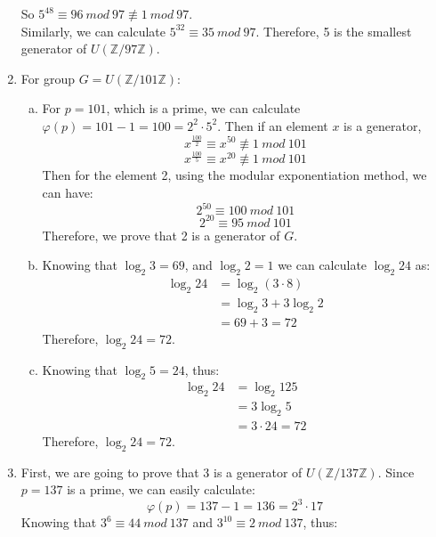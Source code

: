 \documentclass[12pt, a4paper]{article}
\begin{document}
\begin{enumerate}
          So $5^{48} \equiv 96\ mod\ 97 \not\equiv 1\ mod\ 97$.\\
          Similarly, we can calculate $5^{32} \equiv 35\ mod\ 97$. Therefore, 
          5 is the smallest generator of $U(\mathbb{Z}/97\mathbb{Z})$.
    \item For group $G = U(\mathbb{Z}/101\mathbb{Z})$:
          \begin{enumerate}[(a)]
              \item For $p = 101$, which is a prime, we can calculate 
                    $\varphi(p) = 101 - 1 = 100 = 2^2 \cdot 5^2$. 
                    Then if an element $x$ is a generator, 
                    $$x^{\frac{100}{2}} \equiv x^{50} \not\equiv 1\ mod\ 101$$
                    $$x^{\frac{100}{5}} \equiv x^{20} \not\equiv 1\ mod\ 101$$
                    Then for the element 2, using the modular exponentiation method, we can have:
                    $$2^{50} \equiv 100\ mod\ 101$$
                    $$2^{20} \equiv 95\ mod\ 101$$
                    Therefore, we prove that 2 is a generator of $G$.
              \item Knowing that $\log_2 3 = 69$, and $\log_2 2 = 1$
                    we can calculate $\log_2 24$ as:
                    \begin{align*}
                        \log_2 24 &= \log_2 (3\cdot 8)\\
                                  &= \log_2 3 + 3\log_2 2\\
                                  &= 69 + 3 = 72
                    \end{align*}
                    Therefore, $\log_2 24 = 72$.
              \item Knowing that $\log_2 5 = 24$, thus:
                    \begin{align*}
                        \log_2 24 &= \log_2 125\\
                                  &= 3\log_2 5\\
                                  &= 3\cdot 24 = 72
                    \end{align*}
                    Therefore, $\log_2 24 = 72$.
          \end{enumerate}
    \item First, we are going to prove that 3 is a generator of $U(\mathbb{Z}/137\mathbb{Z})$. 
          Since $p = 137$ is a prime, we can easily calculate:
          $$\varphi(p) = 137 - 1 = 136 = 2^3 \cdot 17$$
          Knowing that $3^6 \equiv 44\ mod\ 137$ and $3^{10} \equiv 2\ mod\ 137$, thus:

\end{enumerate}
\end{document}
